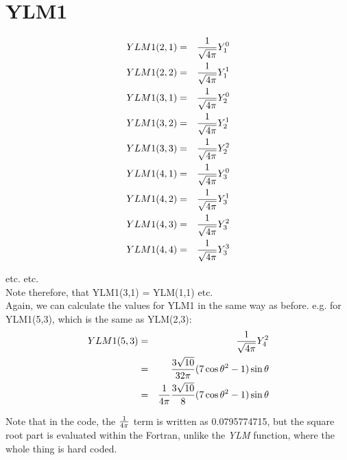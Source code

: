 \section{YLM1}

\begin{eqnarray}
YLM1(2,1)&=&{1 \over \sqrt{4 \pi}} Y_1^0\nonumber\\
YLM1(2,2)&=&{1 \over \sqrt{4 \pi}} Y_1^1\nonumber\\
YLM1(3,1)&=&{1 \over \sqrt{4 \pi}} Y_2^0\nonumber\\
YLM1(3,2)&=&{1 \over \sqrt{4 \pi}} Y_2^1\nonumber\\
YLM1(3,3)&=&{1 \over \sqrt{4 \pi}} Y_2^2\nonumber\\
YLM1(4,1)&=&{1 \over \sqrt{4 \pi}} Y_3^0\nonumber\\
YLM1(4,2)&=&{1 \over \sqrt{4 \pi}} Y_3^1\nonumber\\
YLM1(4,3)&=&{1 \over \sqrt{4 \pi}} Y_3^2\nonumber\\
YLM1(4,4)&=&{1 \over \sqrt{4 \pi}} Y_3^3\nonumber\\
\end{eqnarray}

etc. etc.\\

Note therefore, that YLM1(3,1) = YLM(1,1) etc.\\

Again, we can calculate the values for YLM1 in the same way as before. e.g.
for YLM1(5,3), which is the same as YLM(2,3):\\

\begin{eqnarray}
YLM1(5,3)&=&{1 \over \sqrt{4 \pi}} Y_4^2\nonumber\\
 	 &=&{3 \sqrt{10} \over 32 \pi} (7 \cos\theta^2 - 1) \sin\theta\nonumber\\
         &=&{1 \over 4 \pi} {3 \sqrt{10} \over 8} (7 \cos\theta^2 - 1) \sin\theta\nonumber\\
\end{eqnarray}

Note that in the code, the ${1 \over 4 \pi}$ term is written as
0.0795774715, but the square root part is evaluated within the Fortran,
unlike the {\em YLM} function, where the whole thing is hard coded.\\

